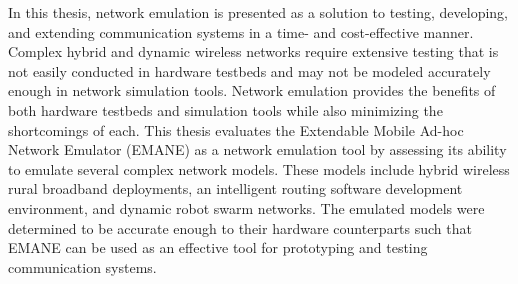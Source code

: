 In this thesis, network emulation is presented as a solution to testing, developing, and extending communication systems in a time- and cost-effective manner.
Complex hybrid and dynamic wireless networks require extensive testing that is not easily conducted in hardware testbeds and may not be modeled accurately enough in network simulation tools.
Network emulation provides the benefits of both hardware testbeds and simulation tools while also minimizing the shortcomings of each.
This thesis evaluates the Extendable Mobile Ad-hoc Network Emulator (EMANE) as a network emulation tool by assessing its ability to emulate several complex network models.
These models include hybrid wireless rural broadband deployments, an intelligent routing software development environment, and dynamic robot swarm networks.
The emulated models were determined to be accurate enough to their hardware counterparts such that EMANE can be used as an effective tool for prototyping and testing communication systems.